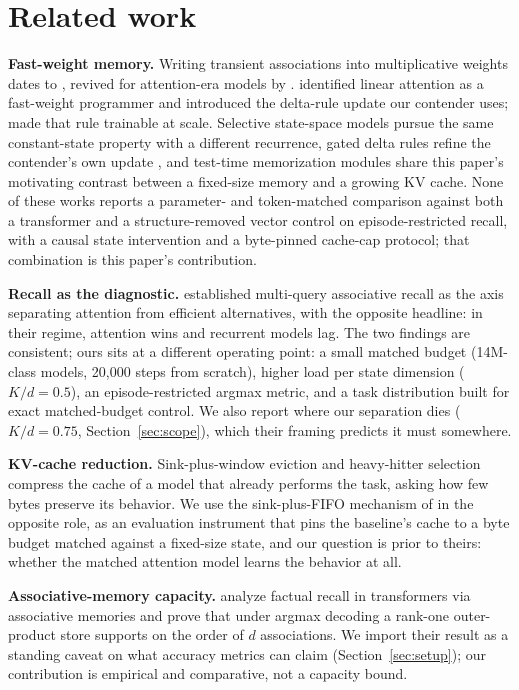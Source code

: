 \section{Related work}
\label{sec:related}

\textbf{Fast-weight memory.} Writing transient associations into
multiplicative weights dates to \citet{schmidhuber1992learning}, revived
for attention-era models by \citet{ba2016using}. \citet{schlag2021linear}
identified linear attention \citep{katharopoulos2020transformers} as a
fast-weight programmer and introduced the delta-rule update our contender
uses; \citet{yang2024parallelizing} made that rule trainable at scale.
Selective state-space models \citep{gu2023mamba} pursue the same
constant-state property with a different recurrence, gated delta rules
refine the contender's own update \citep{yang2024gated}, and test-time
memorization modules \citep{behrouz2024titans} share this paper's
motivating contrast between a fixed-size memory and a growing KV cache.
None of these works
reports a parameter- and token-matched comparison against both a
transformer and a structure-removed vector control on episode-restricted
recall, with a causal state intervention and a byte-pinned cache-cap
protocol; that combination is this paper's contribution.

\textbf{Recall as the diagnostic.} \citet{arora2023zoology} established
multi-query associative recall as the axis separating attention from
efficient alternatives, with the opposite headline: in their regime,
attention wins and recurrent models lag. The two findings are consistent;
ours sits at a different operating point: a small matched budget
(14M-class models, 20{,}000 steps from scratch), higher load per state
dimension ($K/d = 0.5$), an episode-restricted argmax metric, and a task
distribution built for exact matched-budget control. We also report where
our separation dies ($K/d = 0.75$, Section~\ref{sec:scope}), which their
framing predicts it must somewhere.

\textbf{KV-cache reduction.} Sink-plus-window eviction
\citep{xiao2023efficient} and heavy-hitter selection \citep{zhang2023h2o}
compress the cache of a model that already performs the task, asking how
few bytes preserve its behavior. We use the sink-plus-FIFO mechanism of
\citet{xiao2023efficient} in the opposite role, as an evaluation
instrument that pins the baseline's cache to a byte budget matched against
a fixed-size state, and our question is prior to theirs: whether the
matched attention model learns the behavior at all.

\textbf{Associative-memory capacity.} \citet{nichani2024understanding}
analyze factual recall in transformers via associative memories and prove
that under argmax decoding a rank-one outer-product store supports on the
order of $d$ associations. We import their result as a standing caveat on
what accuracy metrics can claim (Section~\ref{sec:setup}); our
contribution is empirical and comparative, not a capacity bound.
